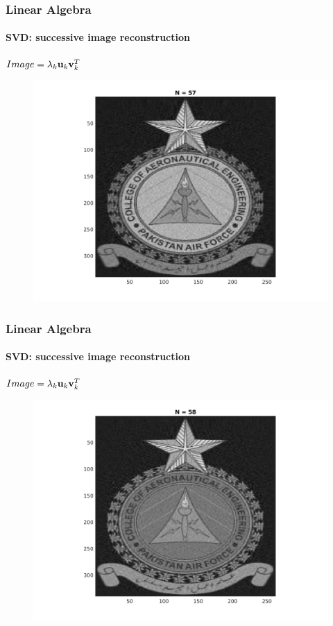 \documentclass[hyperref={pdfpagelabels=true}]{beamer}
\begin{document}
\begin{frame}
\frametitle{Linear Algebra}
\framesubtitle{SVD: successive image reconstruction} 
\small{
\begin{center}
$Image = \lambda_k{\bf u}_k {\bf v}_k^T$
\end{center}}
\begin{figure}[!htb]
\centering
\includegraphics [scale=0.48]{n/b57.png}
\end{figure}
\end{frame}

\begin{frame}
\frametitle{Linear Algebra}
\framesubtitle{SVD: successive image reconstruction} 
\small{
\begin{center}
$Image = \lambda_k{\bf u}_k {\bf v}_k^T$
\end{center}}
\begin{figure}[!htb]
\centering
\includegraphics [scale=0.48]{n/b58.png}
\end{figure}
\end{frame}
\end{document}
